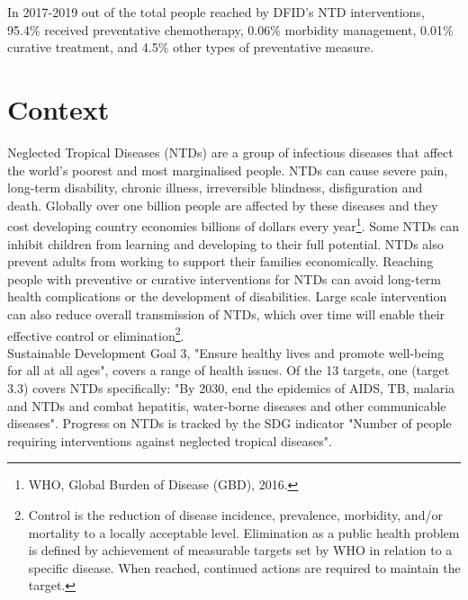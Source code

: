 In 2017-2019 out of the total people reached by DFID's NTD interventions, 95.4\% received preventative chemotherapy, 0.06\% morbidity management, 0.01\% curative treatment, and 4.5\% other types of preventative measure. %


\section{Context}

Neglected Tropical Diseases (NTDs) are a group of infectious diseases that affect the world's poorest and most marginalised people. %
NTDs can cause severe pain, long-term disability, chronic illness, irreversible blindness, disfiguration and death. %
Globally over one billion people are affected by these diseases and they cost developing country economies billions of dollars every year\footnote{WHO, Global Burden of Disease (GBD), 2016.}. %
Some NTDs can inhibit children from learning and developing to their full potential.  NTDs also prevent adults from working to support their families economically. %
Reaching people with preventive or curative interventions for NTDs can avoid long-term health complications or the development of disabilities. %
Large scale intervention can also reduce overall transmission of NTDs, which over time will enable their effective control or elimination\footnote{Control is the reduction of disease incidence, prevalence, morbidity, and/or mortality to a locally acceptable level. Elimination as a public health problem is defined by achievement of measurable targets set by WHO in relation to a specific disease. When reached, continued actions are required to maintain the target.}. \\%

Sustainable Development Goal 3, "Ensure healthy lives and promote well-being for all at all ages", covers a range of health issues. %
Of the 13 targets, one (target 3.3) covers NTDs specifically: "By 2030, end the epidemics of AIDS, TB, malaria and NTDs and combat hepatitis, water-borne diseases and other communicable diseases". %
Progress on NTDs is tracked by the SDG indicator "Number of people requiring interventions against neglected tropical diseases". \\%


